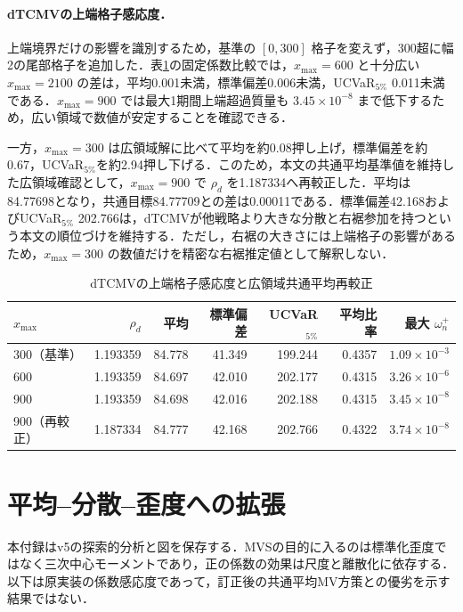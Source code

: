 \documentclass[10pt,a4paper]{article}
\theoremstyle{plain}
\theoremstyle{definition}
\begin{document}
\paragraph{dTCMVの上端格子感応度．}
上端境界だけの影響を識別するため，基準の $[0,300]$ 格子を変えず，300超に幅2の尾部格子を追加した．表\ref{tab:xmax-sensitivity-D0}の固定係数比較では，$x_{\max}=600$ と十分広い $x_{\max}=2100$ の差は，平均0.001未満，標準偏差0.006未満，UCVaR$_{5\%}$ 0.011未満である．$x_{\max}=900$ では最大1期間上端超過質量も $3.45\times10^{-8}$ まで低下するため，広い領域で数値が安定することを確認できる．

一方，$x_{\max}=300$ は広領域解に比べて平均を約0.08押し上げ，標準偏差を約0.67，UCVaR$_{5\%}$を約2.94押し下げる．このため，本文の共通平均基準値を維持した広領域確認として，$x_{\max}=900$ で $\rho_d$ を1.187334へ再較正した．平均は84.77698となり，共通目標84.77709との差は0.00011である．標準偏差42.168およびUCVaR$_{5\%}$ 202.766は，dTCMVが他戦略より大きな分散と右裾参加を持つという本文の順位づけを維持する．ただし，右裾の大きさには上端格子の影響があるため，$x_{\max}=300$ の数値だけを精密な右裾推定値として解釈しない．

\begin{table}[htbp]
\centering
\small
\caption{dTCMVの上端格子感応度と広領域共通平均再較正}
\label{tab:xmax-sensitivity-D0}
\begin{tabular}{lrrrrrr}
\toprule
$x_{\max}$ & $\rho_d$ & 平均 & 標準偏差 & UCVaR$_{5\%}$ & 平均比率 & 最大 $\omega_n^+$ \\
\midrule
300（基準） & 1.193359 & 84.778 & 41.349 & 199.244 & 0.4357 & $1.09\times10^{-3}$ \\
600          & 1.193359 & 84.697 & 42.010 & 202.177 & 0.4315 & $3.26\times10^{-6}$ \\
900          & 1.193359 & 84.698 & 42.016 & 202.188 & 0.4315 & $3.45\times10^{-8}$ \\
900（再較正） & 1.187334 & 84.777 & 42.168 & 202.766 & 0.4322 & $3.74\times10^{-8}$ \\
\bottomrule
\end{tabular}
\end{table}

\section{平均--分散--歪度への拡張}\label{sec:mvs}
本付録はv5の探索的分析と図を保存する．MVSの目的に入るのは標準化歪度ではなく三次中心モーメントであり，正の係数の効果は尺度と離散化に依存する．以下は原実装の係数感応度であって，訂正後の共通平均MV方策との優劣を示す結果ではない．
\end{document}
